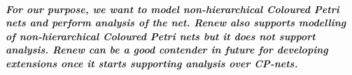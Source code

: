 \subparagraph*{\textnormal{For our purpose, we want to model non-hierarchical Coloured Petri nets and perform analysis of the net. Renew also supports modelling of non-hierarchical Coloured Petri nets but it does not support analysis. Renew can be a good contender in future for developing extensions once it starts supporting analysis over CP-nets.}}

